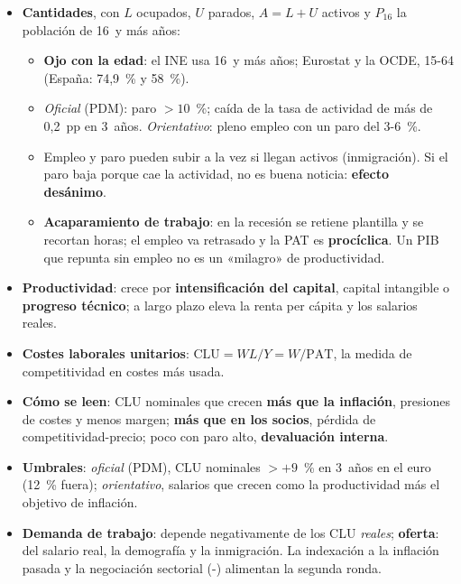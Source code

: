 \documentclass{article}
\begin{document}
\begin{columnas}
\begin{itemize}[itemsep=1.5pt]
\item \textbf{Cantidades}, con $L$ ocupados, $U$ parados, $A=L+U$ activos y $P_{16}$ la población de 16~y más años:
  \begin{itemize}
  \item \textbf{Ojo con la edad}: el INE usa 16~y más años; Eurostat y la OCDE, 15-64 (España: 74,9~\% y 58~\%).
  \item \emph{Oficial} (PDM): paro $>10$~\%; caída de la tasa de actividad de más de 0,2~pp en 3~años. \emph{Orientativo}: pleno empleo con un paro del 3-6~\%.
  \item Empleo y paro pueden subir a la vez si llegan activos (inmigración). Si el paro baja porque cae la actividad, no es buena noticia: \textbf{efecto desánimo}.
  \item \textbf{Acaparamiento de trabajo}: en la recesión se retiene plantilla y se recortan horas; el empleo va retrasado y la PAT es \textbf{procíclica}. Un PIB que repunta sin empleo no es un «milagro» de productividad.
  \end{itemize}
\item \textbf{Productividad}: crece por \textbf{intensificación del capital}, capital intangible o \textbf{progreso técnico}; a largo plazo eleva la renta per cápita y los salarios reales.
\item \textbf{Costes laborales unitarios}: $\mathrm{CLU}=WL/Y=W/\mathrm{PAT}$, la medida de competitividad en costes más usada.
\end{itemize}
\begin{itemize}[itemsep=1.5pt]
\item \textbf{Cómo se leen}: CLU nominales que crecen \textbf{más que la inflación}, presiones de costes y menos margen; \textbf{más que en los socios}, pérdida de competitividad-precio; poco con paro alto, \textbf{devaluación interna}.
\item \textbf{Umbrales}: \emph{oficial} (PDM), CLU nominales $>+9$~\% en 3~años en el euro (12~\% fuera); \emph{orientativo}, salarios que crecen como la productividad más el objetivo de inflación.
\item \textbf{Demanda de trabajo}: depende negativamente de los CLU \emph{reales}; \textbf{oferta}: del salario real, la demografía y la inmigración. La indexación a la inflación pasada y la negociación sectorial (-) alimentan la segunda ronda.

\end{itemize}
\end{columnas}
\end{document}
